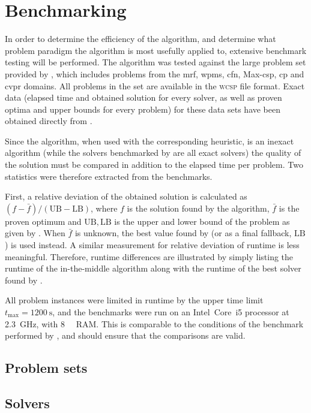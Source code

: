 \section{Benchmarking}
In order to determine the efficiency of the algorithm, and determine what problem paradigm the algorithm is most usefully applied to, extensive benchmark testing will be performed.
The algorithm was tested against the large problem set provided by \textcite{deGivry14}, which includes problems from the \gls{mrf}, \gls{wpms}, \gls{cfn}, Max-\gls{csp}, \gls{cp} and \gls{cvpr} domains.
All problems in the set are available in the \textsc{wcsp} file format.
Exact data (elapsed time and obtained solution for every solver, as well as proven optima and upper bounds for every problem) for these data sets have been obtained directly from \citeauthor{deGivry14}.

Since the algorithm, when used with the corresponding heuristic, is an inexact algorithm (while the solvers benchmarked by \textcite{deGivry14} are all exact solvers) the quality of the solution must be compared in addition to the elapsed time per problem.
Two statistics were therefore extracted from the benchmarks.

\label{pg:bench-method}
First, a relative deviation of the obtained solution is calculated as \(\left(f - \bar{f}\right)/(\mathrm{UB}-\mathrm{LB})\), where \(f\) is the solution found by the algorithm, \(\bar{f}\) is the proven optimum and \(\mathrm{UB}, \mathrm{LB}\) is the upper and lower bound of the problem as given by \textcite[\pno~??]{deGivry14}.
When \(\bar{f}\) is unknown, the best value found by \citeauthor{deGivry14} (or as a final fallback, \(\mathrm{LB}\)) is used instead.
A similar measurement for relative deviation of runtime is less meaningful. Therefore, runtime differences are illustrated by simply listing the runtime of the in-the-middle algorithm along with the runtime of the best solver found by \citeauthor{deGivry14}.

All problem instances were limited in runtime by the upper time limit \(t_{\text{max}} = \SI{1200}{\second}\), and the benchmarks were run on an Intel~Core~i5 processor at \SI{2.3}{\giga\hertz}, with \SI{8}{\gibi\byte} RAM.
This is comparable to the conditions of the benchmark performed by \textcite{deGivry14}, and should ensure that the comparisons are valid.

\subsection{Problem sets}
\subsection{Solvers}
